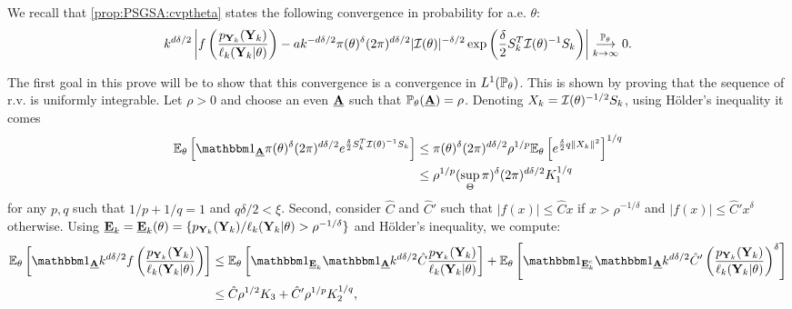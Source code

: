 \begin{proofb}
We recall that \cref{prop:PSGSA:cvptheta} states the following convergence in probability for a.e. $\theta$:
\begin{equation}
    k^{d\delta/2}\left|f\left(\frac{p_{\mbf Y_k}(\mbf Y_k)}{\ell_k(\mbf Y_k|\theta)}\right)  - a k^{-d\delta/2}\pi(\theta)^\delta(2\pi)^{d\delta/2}|\cI(\theta)|^{-\delta/2}\exp\left(\frac{\delta}{2} S_k^T\cI(\theta)^{-1}S_k \right)  \right|
        \conv[\PP_\theta]{k\rightarrow\infty}0.
\end{equation}
    

The first goal in this prove will be to show that this convergence  is a convergence in $L^1(\PP_\theta)$. This is shown by proving that the sequence of r.v. is uniformly integrable. 
Let $\rho>0$ and choose an even $\ubf A$ such that $\PP_\theta(\ubf A)=\rho$. Denoting $X_k=\cI(\theta)^{-1/2}S_k$, using Hölder's inequality it comes
\begin{align}\label{eq:equiintpart1}
    \EE_\theta\left[\indic_{\ubf A} \pi(\theta)^\delta(2\pi)^{d\delta/2}e^{\frac{\delta}{2}S_k^T\cI(\theta)^{-1}S_k}\right]  
        &\leq \pi(\theta)^\delta(2\pi)^{d\delta/2} \rho^{1/p} \EE_\theta\left[e^{\frac{\delta}{2}q\|X_k\|^2}\right]^{1/q} \nonumber\\
        &\leq \rho^{1/p}(\sup_{\Theta}\pi)^\delta (2\pi)^{d\delta/2}K_1^{1/q}
\end{align}
for any $p,q$ such that $1/p+1/q=1$ and $q\delta/2<\xi$. %
Second, consider $\hat C$ and $\hat C'$ such that $|f(x)|\leq\hat Cx$ if $x>\rho^{-1/\delta}$ and $|f(x)|\leq \hat C'x^\delta$ otherwise.
Using $\ubf E_k= \ubf E_k(\theta)=\{p_{\mbf Y_k}(\mbf Y_k)/\ell_k(\mbf Y_k|\theta)>\rho^{-1/\delta}\}$ and Hölder's inequality, we compute:
    \begin{align}
 \EE_\theta\left[ \indic_{\ubf A}k^{d\delta/2}f\left( \frac{p_{\mbf Y_k}(\mbf Y_k)}{\ell_k(\mbf Y_k|\theta)}\right) \right]
%    
\nonumber                  &\leq \EE_\theta\left[ \indic_{\ubf E_k}\indic_{\ubf A} k^{d\delta/2} \hat C  \frac{p_{\mbf Y_k}(\mbf Y_k)}{\ell_k(\mbf Y_k|\theta)} \right] + \EE_\theta\left[ \indic_{\ubf E_k^c}\indic_{\ubf A}k^{d\delta/2}\hat C'\left( \frac{p_{\mbf Y_k}(\mbf Y_k)}{\ell_k(\mbf Y_k|\theta)}\right)^\delta \right] \\
 \label{eq:equiintpart2}
                & \leq \hat C\rho^{1/2} K_3 +  \hat C'\rho^{1/p} K_2^{1/q} , %

\end{align}
\end{proofb}

